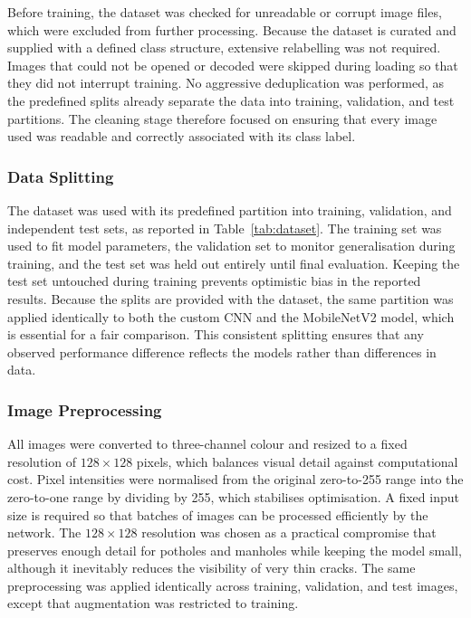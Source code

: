 \documentclass[preprint,12pt]{elsarticle}
\begin{document}
Before training, the dataset was checked for unreadable or corrupt image files, which were excluded from further processing.
Because the dataset is curated and supplied with a defined class structure, extensive relabelling was not required.
Images that could not be opened or decoded were skipped during loading so that they did not interrupt training.
No aggressive deduplication was performed, as the predefined splits already separate the data into training, validation, and test partitions.
The cleaning stage therefore focused on ensuring that every image used was readable and correctly associated with its class label.

\subsubsection{Data Splitting}

The dataset was used with its predefined partition into training, validation, and independent test sets, as reported in Table~\ref{tab:dataset}.
The training set was used to fit model parameters, the validation set to monitor generalisation during training, and the test set was held out entirely until final evaluation.
Keeping the test set untouched during training prevents optimistic bias in the reported results.
Because the splits are provided with the dataset, the same partition was applied identically to both the custom CNN and the MobileNetV2 model, which is essential for a fair comparison.
This consistent splitting ensures that any observed performance difference reflects the models rather than differences in data.

\subsubsection{Image Preprocessing}

All images were converted to three-channel colour and resized to a fixed resolution of $128 \times 128$ pixels, which balances visual detail against computational cost.
Pixel intensities were normalised from the original zero-to-255 range into the zero-to-one range by dividing by 255, which stabilises optimisation.
A fixed input size is required so that batches of images can be processed efficiently by the network.
The $128 \times 128$ resolution was chosen as a practical compromise that preserves enough detail for potholes and manholes while keeping the model small, although it inevitably reduces the visibility of very thin cracks.
The same preprocessing was applied identically across training, validation, and test images, except that augmentation was restricted to training.
\end{document}
